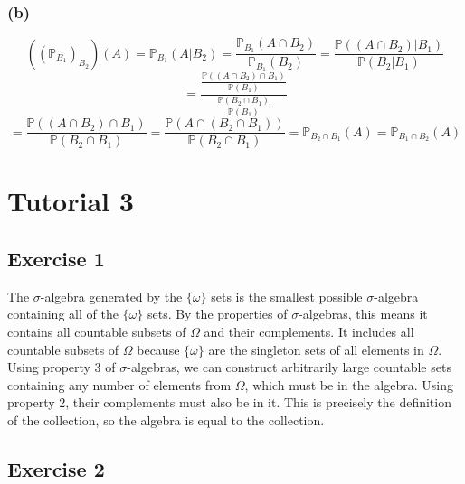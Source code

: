 \documentclass{article}
\begin{document}
\subsubsection*{(b)}

\[
    ((\mathbb{P}_{B_1})_{B_2})(A) = \mathbb{P}_{B_1} (A|B_2) = \frac{\mathbb{P}_{B_1}(A\cap B_2)}{\mathbb{P}_{B_1}(B_2)} = \frac{\mathbb{P}((A\cap B_2) | B_1)}{\mathbb{P}(B_2 | B_1)}
\]
\[
    = \frac{
        \frac{\mathbb{P}((A\cap B_2) \cap B_1)}{\mathbb{P}(B_1)}
    }{
        \frac{\mathbb{P}(B_2 \cap B_1)}{\mathbb{P}(B_1)}
    }
\]
\[
    = \frac{\mathbb{P}((A\cap B_2) \cap B_1)}{\mathbb{P}(B_2 \cap B_1)} = \frac{\mathbb{P}(A \cap (B_2 \cap B_1))}{\mathbb{P}(B_2 \cap B_1)} = \mathbb{P}_{B_2 \cap B_1}(A) = \mathbb{P}_{B_1 \cap B_2}(A)
\]

\section*{Tutorial 3}
\subsection*{Exercise 1}
The $\sigma$-algebra generated by the $\{\omega\}$ sets is the smallest possible $\sigma$-algebra containing all of the $\{\omega\}$ sets. By the properties of $\sigma$-algebras, this means it contains all countable subsets of $\Omega$ and their complements. It includes all countable subsets of $\Omega$ because $\{\omega\}$ are the singleton sets of all elements in $\Omega$. Using property 3 of $\sigma$-algebras, we can construct arbitrarily large countable sets containing any number of elements from $\Omega$, which must be in the algebra. Using property 2, their complements must also be in it. This is precisely the definition of the collection, so the algebra is equal to the collection.

\subsection*{Exercise 2}
\end{document}
